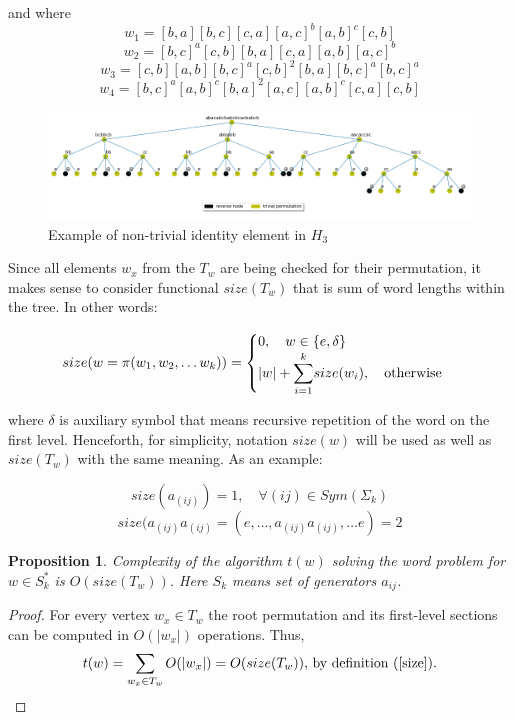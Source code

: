 \documentclass[a4paper,12pt]{amsart}
\newtheorem{proposition}{Proposition}
\begin{document}
and where
$$ w_1 = [b, a][b, c][c, a][a, c]^b[a, b]^c[c, b] $$
$$ w_2 = [b, c]^a[c, b][b, a][c, a][a, b][a, c]^b $$
$$ w_3 = [c, b][a, b][b, c]^a[c, b]^2[b, a][b, c]^a[b, c]^a $$
$$ w_4 = [b, c]^a[a, b]^c[b, a]^2[a, c][a, b]^c[c, a][c, b] $$


\begin{figure}[h]

	\includegraphics[scale=0.5]{non-reducible_trivial.png}
	\caption{Example of non-trivial identity element in $H_3$}
\end{figure}


Since all elements $w_x$ from the $T_w$ are being checked for their permutation, it makes sense to consider functional $size(T_w)$ that is sum of word lengths within the tree. In other words: 

\begin{equation}
\label{size}
size(w = \pi (w_1, w_2, \dots w_k)) =
\begin{cases}
0, \quad  w \in \{e, \delta\} \\
|w| + \mathlarger{\sum}_{i=1}^{k}size(w_i), \quad \text{otherwise}
\end{cases}
\end{equation}

where $\delta$ is auxiliary symbol that means recursive repetition of the word on the first level. Henceforth, for simplicity, notation $size(w)$ will be used as well as $size(T_w)$ with the same meaning. 
As an example: 

$$size(a_{(ij)}) = 1, \quad \forall (ij) \in Sym(\Sigma_k)$$
$$size(a_{(ij)}a_{(ij)} = (e, \dots, a_{(ij)}a_{(ij)}, \dots e) = 2$$


\begin{proposition}
	Complexity of the algorithm $t(w)$ solving the word problem for $w \in S_k^*$ is $O(size(T_w))$. Here $S_k$ means set of generators $a_{ij}$.
\end{proposition}

\begin{proof}
	For every vertex $w_x \in T_w$ the root permutation and its
	first-level sections can be computed in $O(|w_x|)$ operations. Thus,
	$$
	t(w) = \sum_{w_x \in T_w} O(|w_x|) = O(size(T_w)),\, \text{by definition (\ref{size})}.
	$$
	
\end{proof}
\end{document}
